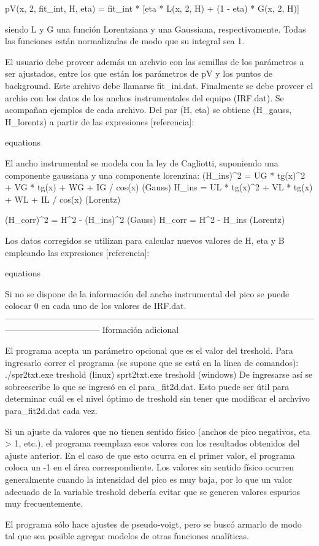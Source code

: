 pV(x, 2\theta, fit_int, H, eta) = fit_int * [eta * L(x, 2\theta, H) + (1 - eta) * G(x, 2\theta, H)]

siendo L y G una función Lorentziana y una Gaussiana, respectivamente. Todas las funciones están normalizadas de modo que su integral sea 1.

El usuario debe proveer además un archvio con las semillas de los parámetros a ser ajustados, entre los que están los parámetros de pV y los puntos de background. Este archivo debe llamarse fit_ini.dat.
Finalmente se debe proveer el archio con los datos de los anchos instrumentales del equipo (IRF.dat). Se acompañan ejemplos de cada archivo.
Del par (H, eta) se obtiene (H_{gauss}, H_{lorentz}) a partir de las expresiones [referencia]:

equations

El ancho instrumental se modela con la ley de Cagliotti, suponiendo una componente gaussiana y una componente lorenzina:
(H_ins)^2 = UG * tg(x)^2 + VG * tg(x) + WG + IG / cos(x)  (Gauss)
H_ins = UL * tg(x)^2 + VL * tg(x) + WL + IL / cos(x)  (Lorentz)

(H_corr)^2 = H^2 - (H_ins)^2 (Gauss)
H_corr = H^2 - H_ins (Lorentz)

Los datos corregidos se utilizan para calcular nuevos valores de H, eta y B empleando las expresiones [referencia]:

equations

Si no se dispone de la información del ancho instrumental del pico se puede colocar 0 en cada uno de los valores de IRF.dat.
---------------------------------------------------------------------------------------------------------------------------------------------
Iformación adicional

El programa acepta un parámetro opcional que es el valor del treshold. Para ingresarlo correr el programa (se supone que se está en la línea de comandos):
./spr2txt.exe treshold (linux)
sprt2txt.exe treshold (windows)
De ingresarse así se sobreescribe lo que se ingresó en el para_fit2d.dat. Esto puede ser útil para determinar cuál es el nivel óptimo de treshold sin tener que modificar el archvivo para_fit2d.dat cada vez.

Si un ajuste da valores que no tienen sentido físico (anchos de pico negativos, eta > 1, etc.), el programa reemplaza esos valores con los resultados obtenidos del ajuste anterior. En el caso de que esto ocurra en el primer valor, el programa coloca un -1 en el área correspondiente.
Los valores sin sentido físico ocurren generalmente cuando la intensidad del pico es muy baja, por lo que un valor adecuado de la variable treshold debería evitar que se generen valores espurios muy frecuentemente.

El programa sólo hace ajustes de pseudo-voigt, pero se buscó armarlo de modo tal que sea posible agregar modelos de otras funciones analíticas.




